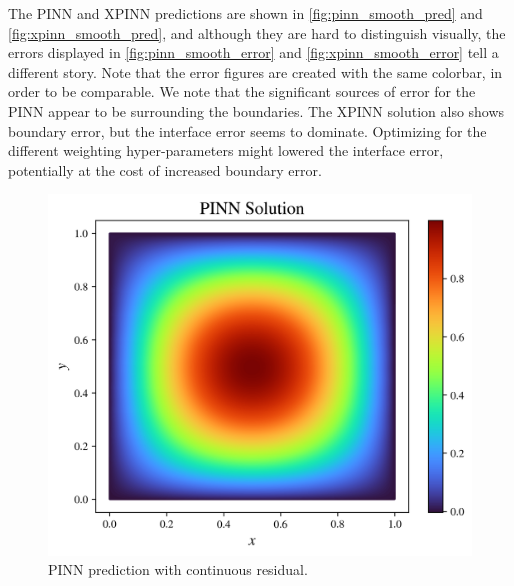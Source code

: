 The PINN and XPINN predictions are shown in \autoref{fig:pinn_smooth_pred} and \autoref{fig:xpinn_smooth_pred}, and although they are hard to distinguish visually, the errors displayed in \autoref{fig:pinn_smooth_error} and \autoref{fig:xpinn_smooth_error} tell a different story.
Note that the error figures are created with the same colorbar, in order to be comparable.
We note that the significant sources of error for the PINN appear to be surrounding the boundaries.
The XPINN solution also shows boundary error, but the interface error seems to dominate.
Optimizing for the different weighting hyper-parameters might lowered the interface error, potentially at the cost of increased boundary error.

\begin{figure}[h]
    \centering
    \includegraphics[width=\linewidth]{Project1XPINNs/figures/Poisson/smooth_single_Poisson_solution.png}
    \caption{PINN prediction with continuous residual.}
    \label{fig:pinn_smooth_pred}
\end{figure}

